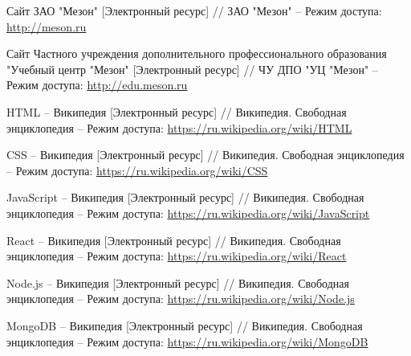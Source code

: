 \begingroup
\renewcommand{\section}[2]{\anonsection{Список использованных источников}}
\begin{thebibliography}{00}
        Сайт ЗАО "Мезон"
        [Электронный ресурс] //
        ЗАО "Мезон"
        --
        Режим доступа:
        \href{http://meson.ru}{http://meson.ru}

        Сайт Частного учреждения дополнительного профессионального образования "Учебный центр "Мезон"
        [Электронный ресурс] //
        ЧУ ДПО "УЦ "Мезон"
        --
        Режим доступа:
        \href{http://edu.meson.ru}{http://edu.meson.ru}


        HTML -- Википедия 
        [Электронный ресурс] //
        Википедия. Свободная энциклопедия
        --
        Режим доступа:
        \href{https://ru.wikipedia.org/wiki/HTML}{https://ru.wikipedia.org/wiki/HTML}

        CSS -- Википедия 
        [Электронный ресурс] //
        Википедия. Свободная энциклопедия
        --
        Режим доступа:
        \href{https://ru.wikipedia.org/wiki/CSS}{https://ru.wikipedia.org/wiki/CSS}
    
        JavaScript -- Википедия 
        [Электронный ресурс] //
        Википедия. Свободная энциклопедия
        --
        Режим доступа:
        \href{https://ru.wikipedia.org/wiki/JavaScript}{https://ru.wikipedia.org/wiki/JavaScript}

        React -- Википедия 
        [Электронный ресурс] //
        Википедия. Свободная энциклопедия
        --
        Режим доступа:
        \href{https://ru.wikipedia.org/wiki/React}{https://ru.wikipedia.org/wiki/React}
        
        Node.js -- Википедия 
        [Электронный ресурс] //
        Википедия. Свободная энциклопедия
        --
        Режим доступа:
        \href{https://ru.wikipedia.org/wiki/Node.js}{https://ru.wikipedia.org/wiki/Node.js}

        MongoDB -- Википедия 
        [Электронный ресурс] //
        Википедия. Свободная энциклопедия
        --
        Режим доступа:
        \href{https://ru.wikipedia.org/wiki/MongoDB}{https://ru.wikipedia.org/wiki/MongoDB}


\end{thebibliography}
